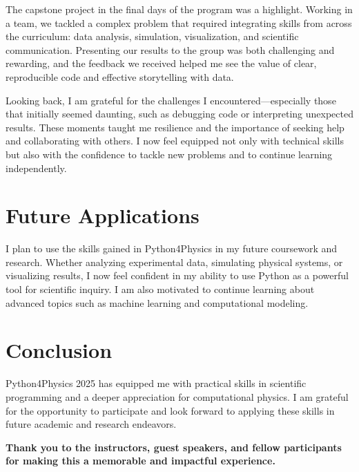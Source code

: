\documentclass[12pt]{article}
\begin{document}
The capstone project in the final days of the program was a highlight. Working in a team, we tackled a complex problem that required integrating skills from across the curriculum: data analysis, simulation, visualization, and scientific communication. Presenting our results to the group was both challenging and rewarding, and the feedback we received helped me see the value of clear, reproducible code and effective storytelling with data.

Looking back, I am grateful for the challenges I encountered—especially those that initially seemed daunting, such as debugging code or interpreting unexpected results. These moments taught me resilience and the importance of seeking help and collaborating with others. I now feel equipped not only with technical skills but also with the confidence to tackle new problems and to continue learning independently.

\section*{Future Applications}
I plan to use the skills gained in Python4Physics in my future coursework and research. Whether analyzing experimental data, simulating physical systems, or visualizing results, I now feel confident in my ability to use Python as a powerful tool for scientific inquiry. I am also motivated to continue learning about advanced topics such as machine learning and computational modeling.

\section*{Conclusion}
Python4Physics 2025 has equipped me with practical skills in scientific programming and a deeper appreciation for computational physics. I am grateful for the opportunity to participate and look forward to applying these skills in future academic and research endeavors.

\vspace{1em}
\noindent\textbf{Thank you to the instructors, guest speakers, and fellow participants for making this a memorable and impactful experience.}
\end{document}
